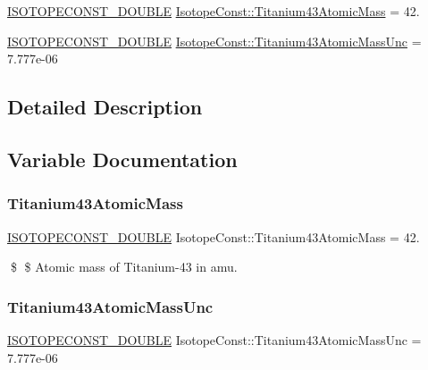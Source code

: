 \begin{DoxyCompactItemize}
\item 
\mbox{\hyperlink{group___isotope_const-_macros_ga8f45a7272ce02c0b4c65c44636ed719a}{I\+S\+O\+T\+O\+P\+E\+C\+O\+N\+S\+T\+\_\+\+D\+O\+U\+B\+LE}} \mbox{\hyperlink{group___isotope_const-_titanium-_ti43_ga85fb3c0fd0564c5d91c0baf9e8a1f2b9}{Isotope\+Const\+::\+Titanium43\+Atomic\+Mass}} = 42.
\item 
\mbox{\hyperlink{group___isotope_const-_macros_ga8f45a7272ce02c0b4c65c44636ed719a}{I\+S\+O\+T\+O\+P\+E\+C\+O\+N\+S\+T\+\_\+\+D\+O\+U\+B\+LE}} \mbox{\hyperlink{group___isotope_const-_titanium-_ti43_ga4fec31baaa5d8c44581a639d1e22325f}{Isotope\+Const\+::\+Titanium43\+Atomic\+Mass\+Unc}} = 7.\+777e-\/06
\end{DoxyCompactItemize}


\subsection{Detailed Description}


\subsection{Variable Documentation}
\mbox{\label{group___isotope_const-_titanium-_ti43_ga85fb3c0fd0564c5d91c0baf9e8a1f2b9}} 
\subsubsection{\texorpdfstring{Titanium43\+Atomic\+Mass}{Titanium43AtomicMass}}
{\footnotesize\ttfamily \mbox{\hyperlink{group___isotope_const-_macros_ga8f45a7272ce02c0b4c65c44636ed719a}{I\+S\+O\+T\+O\+P\+E\+C\+O\+N\+S\+T\+\_\+\+D\+O\+U\+B\+LE}} Isotope\+Const\+::\+Titanium43\+Atomic\+Mass = 42.}

\$ \$ Atomic mass of Titanium-\/43 in amu. \mbox{\label{group___isotope_const-_titanium-_ti43_ga4fec31baaa5d8c44581a639d1e22325f}} 
\subsubsection{\texorpdfstring{Titanium43\+Atomic\+Mass\+Unc}{Titanium43AtomicMassUnc}}
{\footnotesize\ttfamily \mbox{\hyperlink{group___isotope_const-_macros_ga8f45a7272ce02c0b4c65c44636ed719a}{I\+S\+O\+T\+O\+P\+E\+C\+O\+N\+S\+T\+\_\+\+D\+O\+U\+B\+LE}} Isotope\+Const\+::\+Titanium43\+Atomic\+Mass\+Unc = 7.\+777e-\/06}


